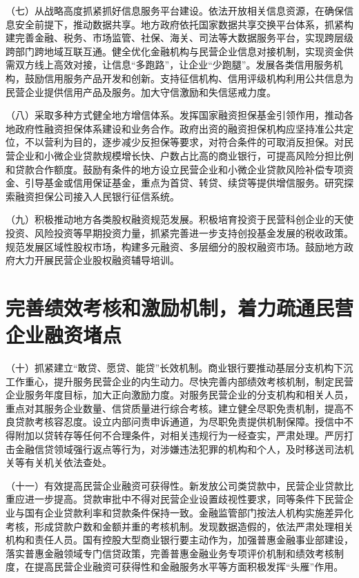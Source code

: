 （七）从战略高度抓紧抓好信息服务平台建设。依法开放相关信息资源，在确保信息安全前提下，推动数据共享。地方政府依托国家数据共享交换平台体系，抓紧构建完善金融、税务、市场监管、社保、海关、司法等大数据服务平台，实现跨层级跨部门跨地域互联互通。健全优化金融机构与民营企业信息对接机制，实现资金供需双方线上高效对接，让信息“多跑路”，让企业“少跑腿”。发展各类信用服务机构，鼓励信用服务产品开发和创新。支持征信机构、信用评级机构利用公共信息为民营企业提供信用产品及服务。加大守信激励和失信惩戒力度。

（八）采取多种方式健全地方增信体系。发挥国家融资担保基金引领作用，推动各地政府性融资担保体系建设和业务合作。政府出资的融资担保机构应坚持准公共定位，不以营利为目的，逐步减少反担保等要求，对符合条件的可取消反担保。对民营企业和小微企业贷款规模增长快、户数占比高的商业银行，可提高风险分担比例和贷款合作额度。鼓励有条件的地方设立民营企业和小微企业贷款风险补偿专项资金、引导基金或信用保证基金，重点为首贷、转贷、续贷等提供增信服务。研究探索融资担保公司接入人民银行征信系统。

（九）积极推动地方各类股权融资规范发展。积极培育投资于民营科创企业的天使投资、风险投资等早期投资力量，抓紧完善进一步支持创投基金发展的税收政策。规范发展区域性股权市场，构建多元融资、多层细分的股权融资市场。鼓励地方政府大力开展民营企业股权融资辅导培训。

\section{完善绩效考核和激励机制，着力疏通民营企业融资堵点}

（十）抓紧建立“敢贷、愿贷、能贷”长效机制。商业银行要推动基层分支机构下沉工作重心，提升服务民营企业的内生动力。尽快完善内部绩效考核机制，制定民营企业服务年度目标，加大正向激励力度。对服务民营企业的分支机构和相关人员，重点对其服务企业数量、信贷质量进行综合考核。建立健全尽职免责机制，提高不良贷款考核容忍度。设立内部问责申诉通道，为尽职免责提供机制保障。授信中不得附加以贷转存等任何不合理条件，对相关违规行为一经查实，严肃处理。严厉打击金融信贷领域强行返点等行为，对涉嫌违法犯罪的机构和个人，及时移送司法机关等有关机关依法查处。

（十一）有效提高民营企业融资可获得性。新发放公司类贷款中，民营企业贷款比重应进一步提高。贷款审批中不得对民营企业设置歧视性要求，同等条件下民营企业与国有企业贷款利率和贷款条件保持一致。金融监管部门按法人机构实施差异化考核，形成贷款户数和金额并重的考核机制。发现数据造假的，依法严肃处理相关机构和责任人员。国有控股大型商业银行要主动作为，加强普惠金融事业部建设，落实普惠金融领域专门信贷政策，完善普惠金融业务专项评价机制和绩效考核制度，在提高民营企业融资可获得性和金融服务水平等方面积极发挥“头雁”作用。

